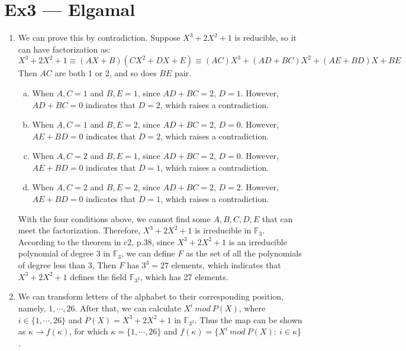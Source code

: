 \documentclass[12pt, a4paper]{article}
\begin{document}
\section*{Ex3 --- Elgamal}
\begin{enumerate}
    \item We can prove this by contradiction. Suppose $X^3 + 2X^2 + 1$ is reducible, so it can have factorization as:
          $$X^3 + 2X^2 + 1 \equiv (AX + B)(CX^2 + DX + E) \equiv (AC)X^3 + (AD+BC)X^2 + (AE+BD)X + BE$$
          Then $AC$ are both 1 or 2, and so does $BE$ pair. 
          \begin{enumerate}[(a)]
              \item When $A, C = 1$ and $B, E = 1$, since $AD+BC = 2$, $D = 1$. 
                    However, $AD+BC = 0$ indicates that $D = 2$, which raises a contradiction.
              \item When $A,C = 1$ and $B,E = 2$, since $AD+BC = 2$, $D = 0$. 
                    However, $AE+BD = 0$ indicates that $D = 2$, which raises a contradiction.
              \item When $A,C = 2$ and $B,E = 1$, since $AD+BC = 2$, $D = 0$. 
                    However, $AE+BD = 0$ indicates that $D = 1$, which raises a contradiction.
              \item When $A,C = 2$ and $B,E = 2$, since $AD+BC = 2$, $D = 2$. 
                    However, $AE+BD = 0$ indicates that $D = 1$, which raises a contradiction.
          \end{enumerate}
          With the four conditions above, we cannot find some $A,B,C,D,E$ that can meet the factorization. 
          Therefore, $X^3 + 2X^2 + 1$ is irreducible in $\mathbb{F}_3$.\\
          According to the theorem in c2, p.38, 
          since $X^3 + 2X^2 + 1$ is an irreducible polynomial of degree 3 in $\mathbb{F}_3$, 
          we can define $F$ as the set of all the polynomials of degree less than 3, 
          Then $F$ has $3^3 = 27$ elements, which indicates that $X^3 + 2X^2 + 1$ defines the field $\mathbb{F}_{3^3}$, 
          which has 27 elements.
    \item We can transform letters of the alphabet to their corresponding position,
          namely, $1,\cdots,26$. After that, we can calculate $X^i\ mod\ P(X)$, 
          where $i\in \{1,\cdots,26\}$ and $P(X) = X^3 + 2X^2 + 1$ in $\mathbb{F}_{3^3}$. 
          Thus the map can be shown as $\kappa\rightarrow f(\kappa)$, 
          for which $\kappa = \{1,\cdots,26\}$ and $f(\kappa) = \{X^i\ mod\ P(X):\ i\in\kappa\}$. 

\end{enumerate}
\end{document}
